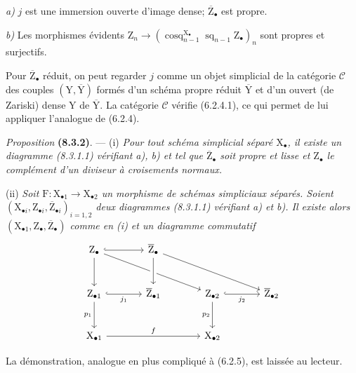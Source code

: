 \documentclass[11pt,leqno]{article}
\begin{document}
\textit{a)} \(j\) est une immersion ouverte d’image dense; \(\overline{\mathrm{Z}}_\bullet\) est propre.

\textit{b)} Les morphismes évidents \(\mathrm{Z}_n\to(\operatorname{cosq}_{n-1}^{\mathrm{X}_\bullet}\operatorname{sq}_{n-1}\mathrm{Z}_\bullet)_n\) sont propres et surjectifs.

Pour \(\overline{\mathrm{Z}}_\bullet\) réduit, on peut regarder \(j\) comme un objet simplicial de la catégorie \(\mathcal{C}\) des couples \((\mathrm{Y},\overline{\mathrm{Y}})\) formés d’un schéma propre réduit \(\overline{\mathrm{Y}}\) et d’un ouvert (de Zariski) dense \(\mathrm{Y}\) de \(\overline{\mathrm{Y}}\). La catégorie \(\mathcal{C}\) vérifie (6.2.4.1), ce qui permet de lui appliquer l’analogue de (6.2.4).

\textit{Proposition} \textbf{(8.3.2)}. — (i) \textit{Pour tout schéma simplicial séparé \(\mathrm{X}_\bullet\), il existe un diagramme \textup{(8.3.1.1)} vérifiant a), b) et tel que \(\overline{\mathrm{Z}}_\bullet\) soit propre et lisse et \(\mathrm{Z}_\bullet\) le complément d’un diviseur à croisements normaux.}

(ii) \textit{Soit \(\mathrm{F}:\mathrm{X}_{\bullet1}\to\mathrm{X}_{\bullet2}\) un morphisme de schémas simpliciaux séparés. Soient \((\mathrm{X}_{\bullet i},\mathrm{Z}_{\bullet i},\overline{\mathrm{Z}}_{\bullet i})_{i=1,2}\) deux diagrammes \textup{(8.3.1.1)} vérifiant a) et b). Il existe alors \((\mathrm{X}_{\bullet1},\mathrm{Z}_\bullet,\overline{\mathrm{Z}}_\bullet)\) comme en \textup{(i)} et un diagramme commutatif}
\[
\begin{tikzcd}[column sep=large,row sep=large]
\mathrm{Z}_\bullet
  \arrow[r,hook] \arrow[d] \arrow[drr]
 & \overline{\mathrm{Z}}_\bullet
   \arrow[d,crossing over] \arrow[drr]
 & &\\
\mathrm{Z}_{\bullet1}
  \arrow[r,hook,"j_1"'] \arrow[d,"p_1"']
 & \overline{\mathrm{Z}}_{\bullet1}
 & \mathrm{Z}_{\bullet2}
   \arrow[r,hook,"j_2"'] \arrow[d,"p_2"']
 & \overline{\mathrm{Z}}_{\bullet2}\\
\mathrm{X}_{\bullet1} \arrow[rr,"f"]
 & & \mathrm{X}_{\bullet2} &
\end{tikzcd}
\]

La démonstration, analogue en plus compliqué à (6.2.5), est laissée au lecteur.
\end{document}
